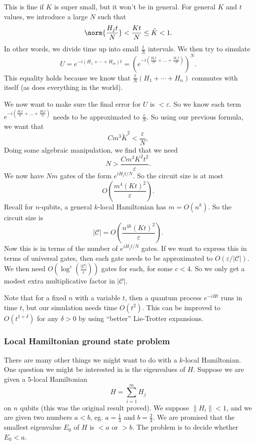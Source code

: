 \documentclass[a4paper]{article}
\begin{document}
This is fine if $K$ is super small, but it won't be in general. For general $K$ and $t$ values, we introduce a large $N$ such that
\[
  \norm{\frac{H_j t}{N}} < \frac{Kt}{N} \leq \tilde{K} < 1.
\]
In other words, we divide time up into small $\frac{t}{N}$ intervals. We then try to simulate
\[
  U = e^{-i (H_1 + \cdots + H_m)t } = \left(e^{-i \left(\frac{H_1 t}{N} + \ldots + \frac{H_n t}{N}\right)}\right)^N.
\]
This equality holds because we know that $\frac{t}{N}(H_1 + \cdots + H_n)$ commutes with itself (as does everything in the world).

We now want to make sure the final error for $U$ is $< \varepsilon$. So we know each term $e^{-i \left(\frac{H_1 t}{n} + \ldots + \frac{H_n t}{n}\right)}$ needs to be approximated to $\frac{\varepsilon}{N}$. So using our previous formula, we want that
\[
  Cm^3 \tilde{K}^2 < \frac{\varepsilon}{N},
\]
Doing some algebraic manipulation, we find that we need
\[
  N > \frac{Cm^3 K^2 t^2}{\varepsilon}.
\]
We now have $Nm$ gates of the form $e^{iH_j t/N}$. So the circuit size is at most
\[
  O\left(\frac{m^4(Kt)^2}{\varepsilon}\right).
\]
Recall for $n$-qubits, a general $k$-local Hamiltonian has $m = O(n^k)$. So the circuit size is
\[
  |\mathcal{C}| = O\left(\frac{n^{4k} (Kt)^2}{\varepsilon}\right).
\]
Now this is in terms of the number of $e^{iH_j t/N}$ gates. If we want to express this in terms of universal gates, then each gate needs to be approximated to $O(\varepsilon/|\mathcal{C}|)$. We then need $O(\log^c(\frac{|\mathcal{C}|}{\varepsilon}))$ gates for each, for some $c < 4$. So we only get a modest extra multiplicative factor in $|\mathcal{C}|$.

Note that for a fixed $n$ with a variable $t$, then a quantum process $e^{-iHt}$ runs in time $t$, but our simulation needs time $O(t^2)$. This can be improved to $O(t^{1 + \delta})$ for any $\delta > 0$ by using ``better'' Lie-Trotter expansions.

\subsubsection*{Local Hamiltonian ground state problem}
There are many other things we might want to do with a $k$-local Hamiltonian. One question we might be interested in is the eigenvalues of $H$. Suppose we are given a $5$-local Hamiltonian
\[
  H = \sum_{i = 1}^m H_j
\]
on $n$ qubits (this was the original result proved). We suppose $\|H_i\| < 1$, and we are given two numbers $a < b$, eg. $a = \frac{1}{3}$ and $b = \frac{2}{3}$. We are promised that the smallest eigenvalue $E_0$ of $H$ is $ < a$ or $> b$. The problem is to decide whether $E_0 < a$.
\end{document}
